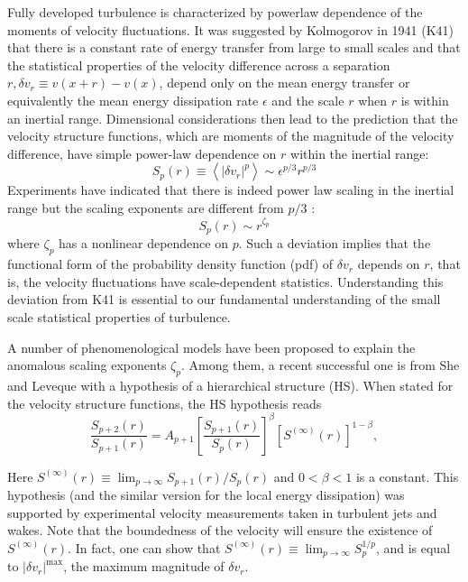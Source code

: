 \documentclass[12pt,a4]{ctexart}
\begin{document}
Fully developed turbulence is characterized by powerlaw dependence of the moments of velocity fluctuations. It was suggested by Kolmogorov in 1941 (K41) that there is a constant rate of energy transfer from large to small scales and that the statistical properties of the velocity difference across a separation $r, \delta v_{r} \equiv v(x+r)-v(x)$, depend only on the mean energy transfer or equivalently the mean energy dissipation rate $\epsilon$ and the scale $r$ when $r$ is within an inertial range. Dimensional considerations then lead to the prediction that the velocity structure functions, which are moments of the magnitude of the velocity difference, have simple power-law dependence on $r$ within the inertial range:
\begin{equation}
   S_{p}(r) \equiv\left\langle\left|\delta v_{r}\right|^{p}\right\rangle \sim \epsilon^{p / 3} r^{p / 3}
\end{equation}
Experiments have indicated that there is indeed power law scaling in the inertial range but the scaling exponents are different from $p / 3$ :
\begin{equation}
   S_{p}(r) \sim r^{\zeta_{p}}
\end{equation}
where $\zeta_{p}$ has a nonlinear dependence on $p$. Such a deviation implies that the functional form of the probability density function (pdf) of $\delta v_{r}$ depends on $r$, that is, the velocity fluctuations have scale-dependent statistics. Understanding this deviation from K41 is essential to our fundamental understanding of the small scale statistical properties of turbulence.

A number of phenomenological models have been proposed to explain the anomalous scaling exponents $\zeta_{p}$. Among them, a recent successful one is from She and Leveque with a hypothesis of a hierarchical structure (HS). When stated for the velocity structure functions, the HS hypothesis reads
\begin{equation}
   \frac{S_{p+2}(r)}{S_{p+1}(r)}=A_{p+1}\left[\frac{S_{p+1}(r)}{S_{p}(r)}\right]^{\beta}\left[S^{(\infty)}(r)\right]^{1-\beta},
   \label{eq:4-1}
\end{equation}

Here $S^{(\infty)}(r) \equiv \lim _{p \rightarrow \infty} S_{p+1}(r) / S_{p}(r)$ and $0<\beta<1$ is a constant. This hypothesis (and the similar version for the local energy dissipation) was supported by experimental velocity measurements taken in turbulent jets and wakes. Note that the boundedness of the velocity will ensure the existence of $S^{(\infty)}(r)$. In fact, one can show that $S^{(\infty)}(r) \equiv \lim _{p \rightarrow \infty} S_{p}^{1 / p}$, and is equal to $\left|\delta v_{r}\right|^{\max }$, the maximum magnitude of $\delta v_{r}$.
\end{document}
